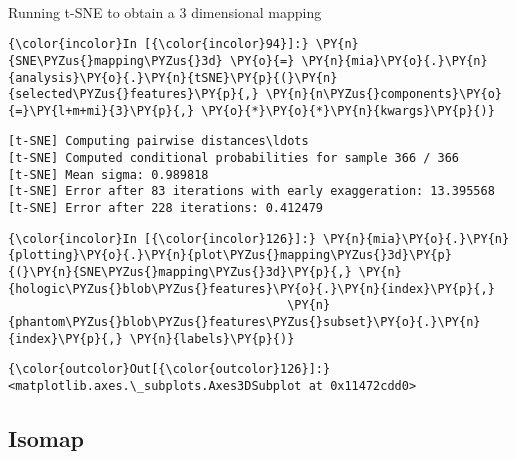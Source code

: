     \begin{center}
    \end{center}
    { \hspace*{\fill} \\}

    Running t-SNE to obtain a 3 dimensional mapping

    \begin{Verbatim}[commandchars=\\\{\}]
{\color{incolor}In [{\color{incolor}94}]:} \PY{n}{SNE\PYZus{}mapping\PYZus{}3d} \PY{o}{=} \PY{n}{mia}\PY{o}{.}\PY{n}{analysis}\PY{o}{.}\PY{n}{tSNE}\PY{p}{(}\PY{n}{selected\PYZus{}features}\PY{p}{,} \PY{n}{n\PYZus{}components}\PY{o}{=}\PY{l+m+mi}{3}\PY{p}{,} \PY{o}{*}\PY{o}{*}\PY{n}{kwargs}\PY{p}{)}
\end{Verbatim}

    \begin{Verbatim}[commandchars=\\\{\}]
[t-SNE] Computing pairwise distances\ldots
[t-SNE] Computed conditional probabilities for sample 366 / 366
[t-SNE] Mean sigma: 0.989818
[t-SNE] Error after 83 iterations with early exaggeration: 13.395568
[t-SNE] Error after 228 iterations: 0.412479
    \end{Verbatim}

    \begin{Verbatim}[commandchars=\\\{\}]
{\color{incolor}In [{\color{incolor}126}]:} \PY{n}{mia}\PY{o}{.}\PY{n}{plotting}\PY{o}{.}\PY{n}{plot\PYZus{}mapping\PYZus{}3d}\PY{p}{(}\PY{n}{SNE\PYZus{}mapping\PYZus{}3d}\PY{p}{,} \PY{n}{hologic\PYZus{}blob\PYZus{}features}\PY{o}{.}\PY{n}{index}\PY{p}{,}
                                       \PY{n}{phantom\PYZus{}blob\PYZus{}features\PYZus{}subset}\PY{o}{.}\PY{n}{index}\PY{p}{,} \PY{n}{labels}\PY{p}{)}
\end{Verbatim}

            \begin{Verbatim}[commandchars=\\\{\}]
{\color{outcolor}Out[{\color{outcolor}126}]:} <matplotlib.axes.\_subplots.Axes3DSubplot at 0x11472cdd0>
\end{Verbatim}

    \subsection{Isomap}\label{isomap}

